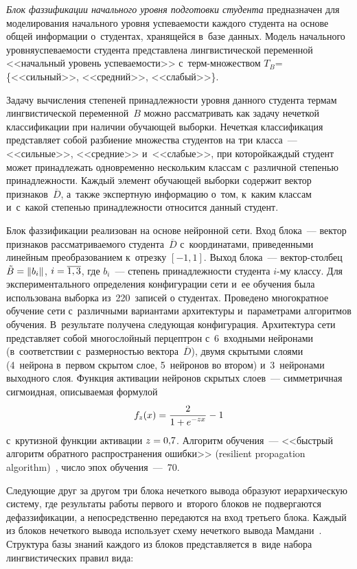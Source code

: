 \begin{multicols}{2}
  \textit{Блок фаззификации начального уровня подготовки студента} 
предназначен для моделирования начального уровня успеваемости каждого 
студента на основе общей информации о~студентах, хранящейся в~базе данных. 
Модель начального уровня\linebreak успеваемости студента представлена 
лингвистической переменной   <<начальный уровень успе\-ва\-емости>> 
  с~терм-мно\-жест\-вом $T_B$\;=\;\{<<сильный>>, <<средний>>, 
<<слабый>>\}.
  
  Задачу вычисления степеней принадлежности уровня данного студента 
термам лингвистической переменной~$B$ можно рассматривать как задачу 
нечеткой классификации при наличии обучающей выборки. Нечеткая 
классификация представляет собой разбиение множества студентов на три 
класса~--- <<сильные>>, <<средние>> и~<<слабые>>, при которой\linebreak каждый 
студент может принадлежать одновре\-менно нескольким классам с~различной 
степенью принадлеж\-ности. Каждый элемент обучающей выборки содержит 
вектор признаков~$\overline{D}$, а~также экспертную информацию о~том, 
к~каким классам и~с~какой степенью принадлежности относится данный 
студент. 
  
  Блок фаззификации реализован на основе нейронной сети. Вход блока~--- 
вектор признаков рассматриваемого студента~$\overline{D}$ с~координатами, 
приведенными линейным преобразованием к~отрезку $[-1,1]$. Выход блока~--- 
век\-тор-стол\-бец $\tilde{B}\hm= \| b_i\|$, $i\hm=\overline{1,3}$, где $b_i$~--- 
степень принадлежности студента $i$-му классу. Для экспериментального 
определения конфигурации сети и~ее обучения была использована выборка 
из~220~записей о студентах. Проведено многократное обучение сети 
с~различными вариантами архитектуры и~параметрами алгоритмов обучения. 
В~результате получена следующая конфигурация. Архитектура сети 
представляет собой многослойный перцептрон с~6~входными нейронами 
(в~соответствии с~размерностью вектора~$\overline{D}$), двумя скрытыми 
слоями (4~нейрона в~первом скрытом слое, 5~нейронов во втором) 
и~3~нейронами выходного слоя. Функция активации нейронов скрытых 
слоев~--- симметричная сигмоидная, описываемая формулой 
$$
f_z(x)=\displaystyle\frac{\displaystyle 2\mathstrut}{\displaystyle 1+e^{-zx}\mathstrut}-1
$$ 
с~крутизной функции активации $z\hm=0{,}7$. Алгоритм 
обучения~--- <<быст\-рый алгоритм обратного распространения ошибки>> 
(resilient propagation algorithm)~\cite{6-al}, число эпох обучения~---~70.
  
  Следующие друг за другом три блока нечеткого вывода образуют 
иерархическую систему, где результаты работы первого и~второго блоков не 
подвергаются дефаззификации, а непосредственно передаются на вход третьего 
блока. Каждый из блоков нечеткого вывода использует схему нечеткого вывода 
Мамдани~\cite{1-al, 7-al}. Структура базы знаний каждого из блоков 
представляется в~виде набора лингвистических правил вида:


\end{multicols}

